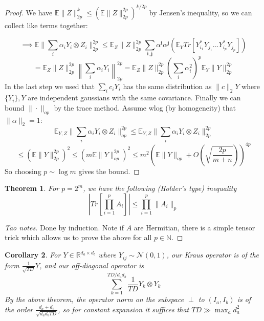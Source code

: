 \documentclass{article}
\newtheorem{theorem}{Theorem}
\newtheorem{corollary}[theorem]{Corollary}
\newtheorem{claim}[theorem]{Claim}
\newcommand{\R}{{\mathbb{R}}}
\renewcommand{\vec}{\bm}
\newcommand{\E}{\mathbb{E}}
\begin{document}
\begin{proof}
We have $\E \|Z\|_{2p}^{k} \leq ( \E \|Z\|_{2p}^{2p} )^{k/2p}$ by Jensen's inequality, so we can collect like terms together:


\[ \implies \E \|\sum_{i} \alpha_{i} Y_{i} \otimes Z_{i}\|_{2p}^{2p}
\leq \E_{Z} \|Z\|_{2p}^{2p} \sum_{\vec{i},\vec{j}} \alpha^{\vec{i}} \alpha^{\vec{j}} (\E_{Y} Tr [ Y_{i_{1}}^{*} Y_{j_{1}} ... Y_{i_{p}}^{*} Y_{j_{p}} ] ) \]
\[ = \E_{Z} \|Z\|_{2p}^{2p} \left\| \sum_{i} \alpha_{i} Y_{i} \right\|_{2p}^{2p}
= \E_{Z} \|Z\|_{2p}^{2p} \left( \sum_{i} \alpha_{i}^{2} \right)^{p} \E_{Y} \|Y\|_{2p}^{2p}     \]
In the last step we used that $\sum_{i} c_{i} Y_{i}$ has the same distribution as $\|c\|_{2} Y$ where $\{Y_{i}\}, Y$ are independent gaussians with the same covariance.
Finally we can bound $\|\cdot\|_{op}$ by the trace method. Assume wlog (by homogeneity) that $\|\alpha\|_{2} = 1$:
\[ \E_{Y,Z} \|\sum_{i} \alpha_{i} Y_{i} \otimes Z_{i} \|_{op}^{2p} \leq \E_{Y,Z} \|\sum_{i} \alpha_{i} Y_{i} \otimes Z_{i} \|_{2p}^{2p} \]
\[ \leq ( \E \|Y\|_{2p}^{2p} )^{2} \leq ( m \E \|Y\|_{op}^{2p} )^{2} \leq m^{2} \left(\E \|Y\|_{op} + O(\sqrt{\frac{2p}{m+n}}) \right)^{4p} \]
So choosing $p \sim \log m$ gives the bound.
\end{proof}

\begin{theorem}
For $p = 2^{m}$, we have the following (Holder's type) inequality
\[ |Tr[\prod_{i=1}^{p} A_{i}]| \leq \prod_{i=1}^{p} \|A_{i}\|_{p}   \]
\end{theorem}
\begin{proof} [Tao notes]
Done by induction. Note if $A$ are Hermitian, there is a simple tensor trick which allows us to prove the above for all $p \in \mathbb{N}$.
\end{proof}

\begin{corollary}
For $Y \in \R^{d_{a} \times d_{b}}$ where $Y_{ij} \sim \mathcal{N}(0,1)$, our Kraus operator is of the form $\frac{1}{\sqrt{TD}} Y$, and our off-diagonal operator is
\[ \sum_{k=1}^{TD/d_{a}d_{b}} \frac{1}{TD} Y_{k} \otimes Y_{k}   \]
By the above theorem, the operator norm on the subspace $\perp$ to $(I_{a},I_{b})$ is of the order $\frac{d_{a}+d_{b}}{\sqrt{d_{a} d_{b} TD}}$, so for constant expansion it suffices that $TD \gg \max_{a} d_{a}^{2}$
\end{corollary}
\end{document}

